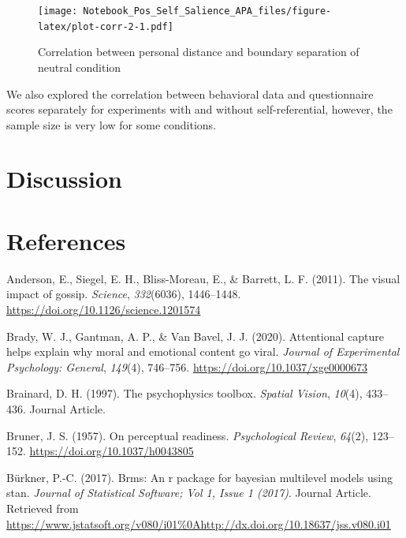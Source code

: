 \documentclass[
  english,
  man]{apa6}
\begin{document}
\begin{figure}
\centering
\texttt{[image: Notebook\_Pos\_Self\_Salience\_APA\_files/figure-latex/plot-corr-2-1.pdf]}
\caption{\label{fig:plot-corr-2}Correlation between personal distance and boundary separation of neutral condition}
\end{figure}

We also explored the correlation between behavioral data and questionnaire scores separately for experiments with and without self-referential, however, the sample size is very low for some conditions.

\hypertarget{discussion-2}{%
\section{Discussion}\label{discussion-2}}

\hypertarget{references}{%
\section{References}\label{references}}

\begingroup
\setlength{\parindent}{-0.5in}
\setlength{\leftskip}{0.5in}

\hypertarget{refs}{}
\leavevmode\hypertarget{ref-anderson_visual_2011}{}%
Anderson, E., Siegel, E. H., Bliss-Moreau, E., \& Barrett, L. F. (2011). The visual impact of gossip. \emph{Science}, \emph{332}(6036), 1446--1448. \url{https://doi.org/10.1126/science.1201574}

\leavevmode\hypertarget{ref-brady_attentional_2020}{}%
Brady, W. J., Gantman, A. P., \& Van Bavel, J. J. (2020). Attentional capture helps explain why moral and emotional content go viral. \emph{Journal of Experimental Psychology: General}, \emph{149}(4), 746--756. \url{https://doi.org/10.1037/xge0000673}

\leavevmode\hypertarget{ref-Brainard_1997}{}%
Brainard, D. H. (1997). The psychophysics toolbox. \emph{Spatial Vision}, \emph{10}(4), 433--436. Journal Article.

\leavevmode\hypertarget{ref-bruner_perceptual_1957}{}%
Bruner, J. S. (1957). On perceptual readiness. \emph{Psychological Review}, \emph{64}(2), 123--152. \url{https://doi.org/10.1037/h0043805}

\leavevmode\hypertarget{ref-Buxfcrkner_2017}{}%
Bürkner, P.-C. (2017). Brms: An r package for bayesian multilevel models using stan. \emph{Journal of Statistical Software; Vol 1, Issue 1 (2017)}. Journal Article. Retrieved from \url{https://www.jstatsoft.org/v080/i01\%0Ahttp://dx.doi.org/10.18637/jss.v080.i01}
\end{document}
